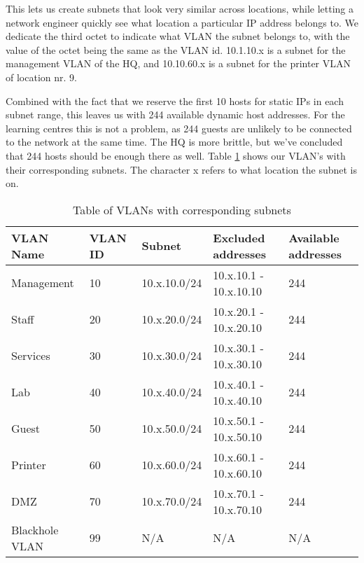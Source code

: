 This lets us create subnets that look very similar across locations, while letting a network engineer quickly see what location a particular IP address belongs to. We dedicate the third octet to indicate what VLAN the subnet belongs to, with the value of the octet being the same as the VLAN id. 10.1.10.x is a subnet for the management VLAN of the HQ, and 10.10.60.x is a subnet for the printer VLAN of location nr. 9.

Combined with the fact that we reserve the first 10 hosts for static IPs in each subnet range, this leaves us with 244 available dynamic host addresses. For the learning centres this is not a problem, as 244 guests are unlikely to be connected to the network at the same time. The HQ is more brittle, but we've concluded that 244 hosts should be enough there as well. Table \ref{VLANsubnettable} shows our VLAN's with their corresponding subnets. The character x refers to what location the subnet is on.


\begin{table}[H]
\caption{Table of VLANs with corresponding subnets}
\label{VLANsubnettable}
\begin{tabular}{|l|l|l|l|l|}
\hline
\textbf{VLAN Name} & \textbf{VLAN ID} & \textbf{Subnet} & \textbf{Excluded addresses} & \textbf{Available addresses} \\ \hline

Management     & 10      & 10.x.10.0/24 & 10.x.10.1 - 10.x.10.10 & 244 \\ \hline
Staff          & 20      & 10.x.20.0/24 & 10.x.20.1 - 10.x.20.10 & 244 \\ \hline
Services       & 30      & 10.x.30.0/24 & 10.x.30.1 - 10.x.30.10 & 244 \\ \hline
Lab            & 40      & 10.x.40.0/24 & 10.x.40.1 - 10.x.40.10 & 244 \\ \hline
Guest          & 50      & 10.x.50.0/24 & 10.x.50.1 - 10.x.50.10 & 244 \\ \hline
Printer        & 60      & 10.x.60.0/24 & 10.x.60.1 - 10.x.60.10 & 244 \\ \hline
DMZ            & 70      & 10.x.70.0/24 & 10.x.70.1 - 10.x.70.10 & 244 \\ \hline
Blackhole VLAN & 99      & N/A          & N/A                    & N/A \\ \hline
\end{tabular}
\end{table}

